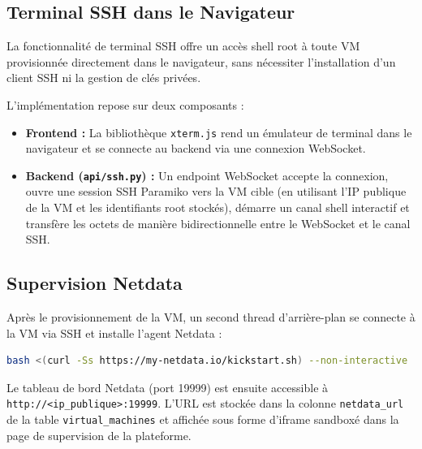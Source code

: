 
\subsection{Terminal SSH dans le Navigateur}

La fonctionnalité de terminal SSH offre un accès shell root à toute VM provisionnée
directement dans le navigateur, sans nécessiter l'installation d'un client SSH ni
la gestion de clés privées.

L'implémentation repose sur deux composants :

\begin{itemize}
  \item \textbf{Frontend :} La bibliothèque \texttt{xterm.js} rend un émulateur de
        terminal dans le navigateur et se connecte au backend via une connexion
        WebSocket.
  \item \textbf{Backend (\texttt{api/ssh.py}) :} Un endpoint WebSocket accepte la
        connexion, ouvre une session SSH Paramiko vers la VM cible (en utilisant l'IP
        publique de la VM et les identifiants root stockés), démarre un canal shell
        interactif et transfère les octets de manière bidirectionnelle entre le
        WebSocket et le canal SSH.
\end{itemize}


\subsection{Supervision Netdata}

Après le provisionnement de la VM, un second thread d'arrière-plan se connecte à la
VM via SSH et installe l'agent Netdata :

\begin{lstlisting}[language=bash, caption={Commande d'installation de Netdata (exécutée via SSH)},
                   label={lst:netdata_install}]
bash <(curl -Ss https://my-netdata.io/kickstart.sh) --non-interactive
\end{lstlisting}

Le tableau de bord Netdata (port 19999) est ensuite accessible à
\texttt{http://<ip\_publique>:19999}. L'URL est stockée dans la colonne
\texttt{netdata\_url} de la table \texttt{virtual\_machines} et affichée sous forme
d'iframe sandboxé dans la page de supervision de la plateforme.

